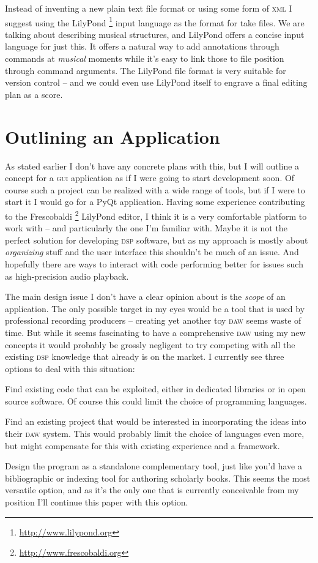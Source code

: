 \documentclass[11pt,a4paper]{article}
\begin{document}
\medskip
Instead of inventing a new plain text file format or using some form of
\textsc{xml} I suggest using the LilyPond%
\footnote{\url{http://www.lilypond.org}}
input language as the format for take files.
We are talking about describing musical structures, and LilyPond offers a
concise input language for just this.
It offers a natural way to add annotations through commands at \emph{musical}
moments while it's easy to link those to file position through command
arguments.
The LilyPond file format is very suitable for version control -- and we could
even use LilyPond itself to engrave a final editing plan as a score.

\section{Outlining an Application}

As stated earlier I don't have any concrete plans with this, but I will outline
a concept for a \textsc{gui} application as if I were going to start development
soon.
Of course such a project can be realized with a wide range of tools, but if I
were to start it I would go for a PyQt application.
Having some experience contributing to the Frescobaldi%
\footnote{\url{http://www.frescobaldi.org}}
LilyPond editor, I think it is a very comfortable platform to work with -- and
particularly the one I'm familiar with. Maybe it is not the perfect solution
for developing \textsc{dsp} software, but as my approach is mostly about
\emph{organizing} stuff and the user interface this shouldn't be much of an issue.
And hopefully there are ways to interact with code performing better for issues
such as high-precision audio playback.

The main design issue I don't have a clear opinion about is the \emph{scope} of
an application.
The only possible target in my eyes would be a tool that is used by
professional recording producers -- creating yet another toy \textsc{daw} seems
waste of time.
But while it seems fascinating to have a comprehensive \textsc{daw} using my new
concepts it would probably be grossly negligent to try competing with all the
existing \textsc{dsp} knowledge that already is on the market.
I currently see three options to deal with this situation:

\begin{itemize*}
\item Find existing code that can be exploited, either in dedicated libraries or
in open source software.
Of course this could limit the choice of programming languages.
\item Find an existing project that would be interested in incorporating the
ideas into their \textsc{daw} system.
This would probably limit the choice of languages even more, but might
compensate for this with existing experience and a framework.
\item Design the program as a standalone complementary tool, just like you'd
have a bibliographic or indexing tool for authoring scholarly books.
This seems the most versatile option, and as it's the only one that is currently
conceivable from my position I'll continue this paper with this option.
\end{itemize*}
\end{document}
